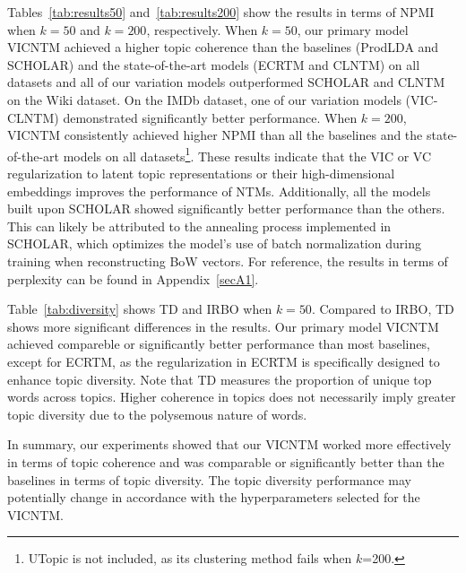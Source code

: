 \documentclass{article}
\begin{document}
Tables~\ref{tab:results50} and~\ref{tab:results200} show the results in terms of NPMI when $k=50$ and $k=200$, respectively. 
When $k=50$, our primary model VICNTM achieved a higher topic coherence than the baselines (ProdLDA and SCHOLAR) and the state-of-the-art models (ECRTM and CLNTM) on all datasets and all of our variation models outperformed SCHOLAR and CLNTM on the Wiki dataset. 
On the IMDb dataset, one of our variation models (VIC-CLNTM) demonstrated significantly better performance. 
When $k=200$, VICNTM consistently achieved higher NPMI than all the baselines and the state-of-the-art models on all datasets\footnote{UTopic is not included, as its clustering method fails when $k$=200.}.
These results indicate that the VIC or VC regularization to latent topic representations or their high-dimensional embeddings improves the performance of NTMs.
Additionally, all the models built upon SCHOLAR showed significantly better performance than the others. This can likely be attributed to the annealing process implemented in SCHOLAR, which optimizes the model’s use of batch normalization during training when reconstructing BoW vectors.
For reference, the results in terms of perplexity can be found in Appendix~\ref{secA1}.

Table~\ref{tab:diversity} shows TD and IRBO when $k=50$. 
Compared to IRBO, TD shows more significant differences in the results.
Our primary model VICNTM achieved compareble or significantly better performance than most baselines, except for ECRTM, as the regularization in ECRTM is specifically designed to enhance topic diversity.
Note that TD measures the proportion of unique top words across topics.
Higher coherence in topics does not necessarily imply greater topic diversity due to the polysemous nature of words.

In summary, our experiments showed that our VICNTM worked more effectively in terms of topic coherence and was comparable or significantly better than the baselines in terms of topic diversity. 
The topic diversity performance may potentially change in accordance with the hyperparameters selected for the VICNTM.
\end{document}
